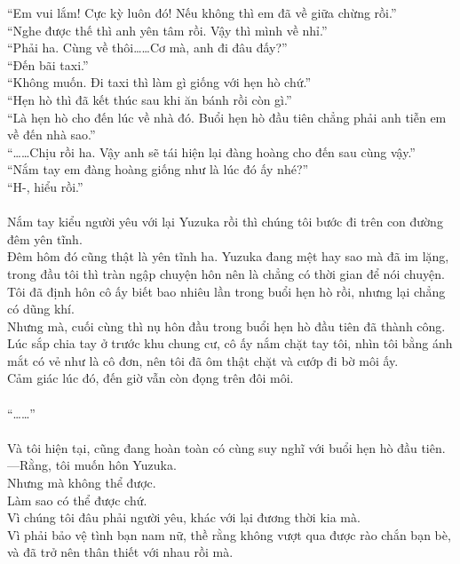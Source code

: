 \documentclass[12pt,a4paper, twosides]{book}
\begin{document}
“Em vui lắm! Cực kỳ luôn đó! Nếu không thì em đã về giữa chừng rồi.”\\
“Nghe được thế thì anh yên tâm rồi. Vậy thì mình về nhỉ.”\\
“Phải ha. Cùng về thôi……Cơ mà, anh đi đâu đấy?”\\
“Đến bãi taxi.”\\
“Không muốn. Đi taxi thì làm gì giống với hẹn hò chứ.”\\
“Hẹn hò thì đã kết thúc sau khi ăn bánh rồi còn gì.”\\
“Là hẹn hò cho đến lúc về nhà đó. Buổi hẹn hò đầu tiên chẳng phải anh tiễn em về đến nhà sao.”\\
“……Chịu rồi ha. Vậy anh sẽ tái hiện lại đàng hoàng cho đến sau cùng vậy.”\\
“Nắm tay em đàng hoàng giống như là lúc đó ấy nhé?”\\
“H-, hiểu rồi.”\\
\\
Nắm tay kiểu người yêu với lại Yuzuka rồi thì chúng tôi bước đi trên con đường đêm yên tĩnh.\\
Đêm hôm đó cũng thật là yên tĩnh ha. Yuzuka đang mệt hay sao mà đã im lặng, trong đầu tôi thì tràn ngập chuyện hôn nên là chẳng có thời gian để nói chuyện.\\
Tôi đã định hôn cô ấy biết bao nhiêu lần trong buổi hẹn hò rồi, nhưng lại chẳng có dũng khí.\\
Nhưng mà, cuối cùng thì nụ hôn đầu trong buổi hẹn hò đầu tiên đã thành công.\\
Lúc sắp chia tay ở trước khu chung cư, cô ấy nắm chặt tay tôi, nhìn tôi bằng ánh mắt có vẻ như là cô đơn, nên tôi đã ôm thật chặt và cướp đi bờ môi ấy.\\
Cảm giác lúc đó, đến giờ vẫn còn đọng trên đôi môi.\\
\\
“……”\\
\\
Và tôi hiện tại, cũng đang hoàn toàn có cùng suy nghĩ với buổi hẹn hò đầu tiên.\\
—Rằng, tôi muốn hôn Yuzuka.\\
Nhưng mà không thể được.\\
Làm sao có thể được chứ.\\
Vì chúng tôi đâu phải người yêu, khác với lại đương thời kia mà.\\
Vì phải bảo vệ tình bạn nam nữ, thề rằng không vượt qua được rào chắn bạn bè, và đã trở nên thân thiết với nhau rồi mà.\\
\end{document}
